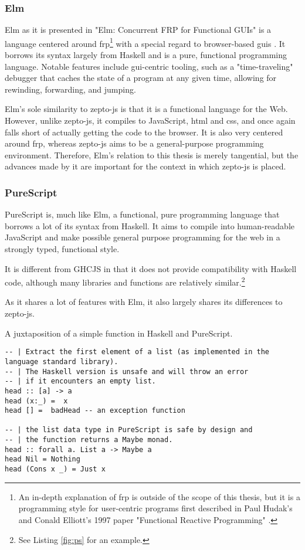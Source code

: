 \documentclass[oneside,11pt,xetex]{scrbook}
\begin{document}
\subsubsection{Elm}

Elm as it is presented in "Elm: Concurrent FRP for Functional GUIs"
is a language centered around \gls{frp}\footnote{An in-depth
explanation of \gls{frp} is outside of the scope of this thesis,
but it is a programming style for user-centric programs first described
in Paul Hudak's and Conald Elliott's 1997 paper "Functional Reactive
Programming" \parencite{FRP}.} with a special regard to browser-based
\glspl{gui} \parencite{CPL}. It borrows its syntax largely from Haskell
and is a pure, functional programming language. Notable features include
\gls{gui}-centric tooling, such as a "time-traveling" debugger that caches
the state of a program at any given time, allowing for rewinding, forwarding,
and jumping.

Elm's sole similarity to zepto-js is that it is a functional language for the Web.
However, unlike zepto-js, it compiles to JavaScript, \gls{html} and \gls{css}, and
once again falls short of actually getting the code to the browser. It is also very
centered around \gls{frp}, whereas zepto-js aims to be a general-purpose programming
environment. Therefore, Elm's relation to this thesis is merely tangential, but the
advances made by it are important for the context in which zepto-js is placed.

\subsubsection{PureScript}

PureScript is, much like Elm, a functional, pure programming language
that borrows a lot of its syntax from Haskell. It aims to compile into
human-readable JavaScript and make possible general purpose programming
for the web in a strongly typed, functional style.

It is different from GHCJS in that it does not provide compatibility
with Haskell code, although many libraries and functions are relatively
similar.\footnote{See Listing \ref{fig:ps} for an example.}

As it shares a lot of features with Elm, it also largely shares its
differences to zepto-js.

\begin{listing}[H]
\caption{A juxtaposition of a simple function in Haskell and PureScript.}
\begin{verbatim}
-- | Extract the first element of a list (as implemented in the language standard library).
-- | The Haskell version is unsafe and will throw an error
-- | if it encounters an empty list.
head :: [a] -> a
head (x:_) =  x
head [] =  badHead -- an exception function

-- | the list data type in PureScript is safe by design and
-- | the function returns a Maybe monad.
head :: forall a. List a -> Maybe a
head Nil = Nothing
head (Cons x _) = Just x
\end{verbatim}
\label{fig:ps}
\end{listing}
\end{document}
